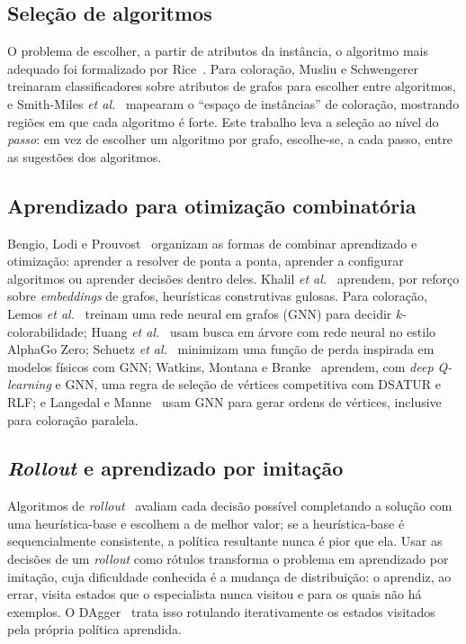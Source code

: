 \documentclass[conference,a4paper]{IEEEtran}
\begin{document}
\subsection{Seleção de algoritmos}
O problema de escolher, a partir de atributos da instância, o algoritmo mais adequado foi
formalizado por Rice~\cite{rice1976}. Para coloração, Musliu e
Schwengerer~\cite{musliu2013} treinaram classificadores sobre atributos de grafos para
escolher entre algoritmos, e Smith-Miles \emph{et al.}~\cite{smithmiles2014} mapearam o
``espaço de instâncias'' de coloração, mostrando regiões em que cada algoritmo é forte. Este
trabalho leva a seleção ao nível do \emph{passo}: em vez de escolher um algoritmo por grafo,
escolhe-se, a cada passo, entre as sugestões dos algoritmos.

\subsection{Aprendizado para otimização combinatória}
Bengio, Lodi e Prouvost~\cite{bengio2021} organizam as formas de combinar aprendizado e
otimização: aprender a resolver de ponta a ponta, aprender a configurar algoritmos ou
aprender decisões dentro deles. Khalil \emph{et al.}~\cite{khalil2017} aprendem, por reforço
sobre \emph{embeddings} de grafos, heurísticas construtivas gulosas. Para coloração, Lemos
\emph{et al.}~\cite{lemos2019} treinam uma rede neural em grafos (GNN) para decidir
$k$-colorabilidade; Huang \emph{et al.}~\cite{huang2019} usam busca em árvore com rede neural
no estilo AlphaGo Zero; Schuetz \emph{et al.}~\cite{schuetz2022} minimizam uma função de perda
inspirada em modelos físicos com GNN; Watkins, Montana e Branke~\cite{watkins2023} aprendem, com
\emph{deep Q-learning} e GNN, uma regra de seleção de vértices competitiva com DSATUR e RLF; e
Langedal e Manne~\cite{langedal2024} usam GNN para gerar ordens de vértices, inclusive para
coloração paralela.

\subsection{\emph{Rollout} e aprendizado por imitação}
Algoritmos de \emph{rollout}~\cite{bertsekas1997} avaliam cada decisão possível completando a
solução com uma heurística-base e escolhem a de melhor valor; se a heurística-base é
sequencialmente consistente, a política resultante nunca é pior que ela. Usar as decisões de
um \emph{rollout} como rótulos transforma o problema em aprendizado por imitação, cuja
dificuldade conhecida é a mudança de distribuição: o aprendiz, ao errar, visita estados que o
especialista nunca visitou e para os quais não há exemplos. O DAgger~\cite{ross2011} trata
isso rotulando iterativamente os estados visitados pela própria política aprendida.
\end{document}
